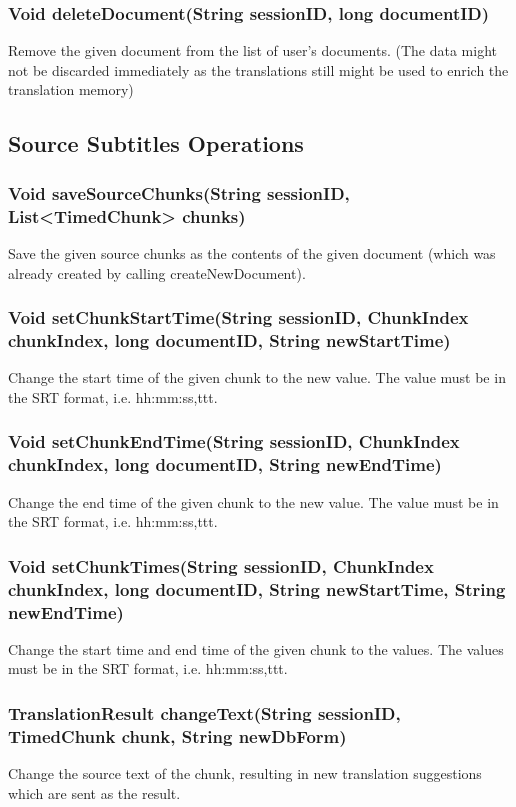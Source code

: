 \subsubsection{Void deleteDocument(String sessionID, long documentID)}
Remove the given document from the list of user's documents.
(The data might not be discarded immediately
as the translations still might be used to enrich the translation memory)	 

\subsection{Source Subtitles Operations}

\subsubsection{Void saveSourceChunks(String sessionID, List<TimedChunk> chunks)}
Save the given source chunks as the contents of the given document
(which was already created by calling createNewDocument).

\subsubsection{Void setChunkStartTime(String sessionID, ChunkIndex chunkIndex, long documentID, String newStartTime)}
Change the start time of the given chunk to the new value. The value must be in the SRT format, i.e. hh:mm:ss,ttt.

\subsubsection{Void setChunkEndTime(String sessionID, ChunkIndex chunkIndex, long documentID, String newEndTime)}
Change the end time of the given chunk to the new value. The value must be in the SRT format, i.e. hh:mm:ss,ttt.

\subsubsection{Void setChunkTimes(String sessionID, ChunkIndex chunkIndex, long documentID, String newStartTime, String newEndTime)}
Change the start time and end time of the given chunk to the values. The values must be in the SRT format, i.e. hh:mm:ss,ttt.

\subsubsection{TranslationResult changeText(String sessionID, TimedChunk chunk, String newDbForm)}
Change the source text of the chunk,
resulting in new translation suggestions
which are sent as the result.

